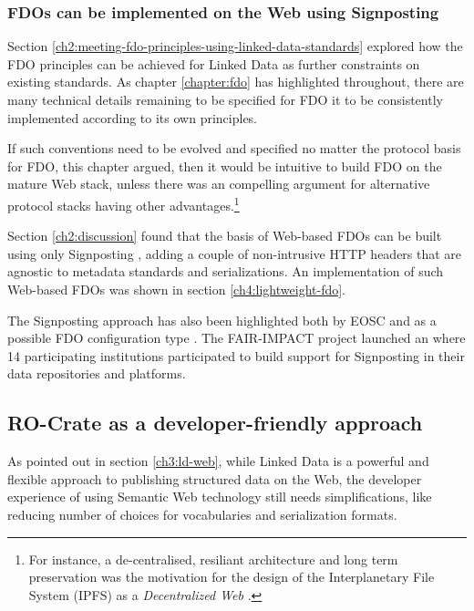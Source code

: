 \subsubsection{FDOs can be implemented on the Web using Signposting}
\label{ch61:signposting}

Section \vref{ch2:meeting-fdo-principles-using-linked-data-standards} explored how the FDO principles can be achieved for Linked Data as further constraints on existing standards.
As chapter \ref{chapter:fdo} has highlighted throughout, there are many technical details remaining to be specified for FDO it to be consistently implemented according to its own principles.

If such conventions need to be evolved and specified no matter the protocol basis for FDO, this chapter argued, then it would be intuitive to build FDO on the mature Web stack, unless there was an compelling argument for alternative protocol stacks having other advantages.\footnote{
  For instance, a de-centralised, resiliant architecture and long term preservation was the motivation for the design of the Interplanetary File System (IPFS) as a \emph{Decentralized Web} \cite{Trautwein 2022}.
}

Section \ref{ch2:discussion} found that the basis of Web-based FDOs can be built using only Signposting \cite{Van de Sompel 2015,Van de Sompel 2022}, adding a couple of non-intrusive HTTP headers that are agnostic to metadata standards and serializations. An implementation of such Web-based FDOs was shown in section \ref{ch4:lightweight-fdo}. 

The Signposting approach has also been highlighted both by EOSC \cite{Wilkinson 2022a,Wilkinson 2024} and as a possible FDO configuration type \cite{Lannom 2022a}.
The FAIR-IMPACT project launched an  where 14 participating institutions participated to build support for Signposting \cite{Soiland-Reyes 2023b} in their data repositories and platforms.



\subsection{RO-Crate as a developer-friendly approach}
\label{ch61:crate}

As pointed out in section \vref{ch3:ld-web}, while Linked Data is a powerful and flexible approach to publishing structured data on the Web, the developer experience of using Semantic Web technology still needs simplifications, like reducing number of choices for vocabularies and serialization formats. 


